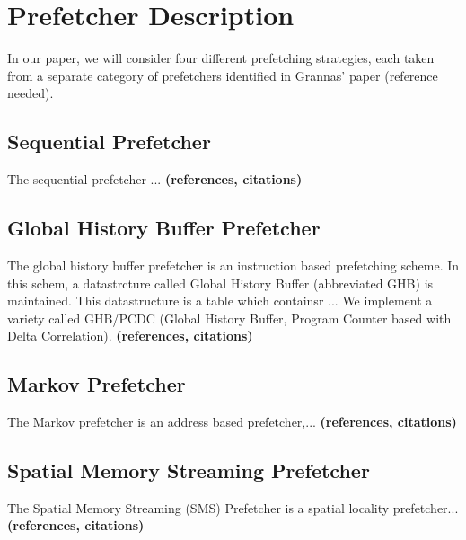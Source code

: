 
\section{Prefetcher Description}
\label{sec:prefetcherDescription}

In our paper, we will consider four different prefetching strategies,
each taken from a separate category of prefetchers identified in
Grannas' paper (reference needed).

\subsection{Sequential Prefetcher}
\label{sec:sequentialPrefetcher}
The sequential prefetcher ... 
{\bf (references, citations)}

\subsection{Global History Buffer Prefetcher}
\label{sec:ghbPcdcPrefetcher}
The global history buffer prefetcher is an instruction based
prefetching scheme. In this schem, a datastrcture called Global
History Buffer (abbreviated GHB) is maintained. This datastructure is
a table which containsr  ... We implement a variety called GHB/PCDC (Global History
Buffer, Program Counter based with Delta Correlation).  {\bf
  (references, citations)}

\subsection{Markov Prefetcher}
\label{sec:markovPrefetcher}
The Markov prefetcher is an address based prefetcher,...
{\bf (references, citations)}

\subsection{Spatial Memory Streaming Prefetcher}
\label{sec:smsPrefetcher}
The Spatial Memory Streaming (SMS) Prefetcher is a spatial locality
prefetcher...  {\bf (references, citations)}
